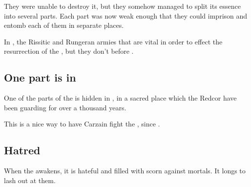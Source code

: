 
They were unable to destroy it, but they somehow managed to split its essence into several parts. Each part was now weak enough that they could imprison and entomb each of them in separate places. 

In \emph{\TwilightAngelRemember{}}, the Rissitic and Rungeran armies  that are vital in order to effect the resurrection of the \Haskelek, but they don't  before \emph{\CarzainWithRedcorBook}. 







\subsection{One part is in \Redce}
One of the parts of the \Haskelek{} is hidden in \Redce, in a sacred place which the Redcor have been guarding for over a thousand years. 

This is a nice way to have Carzain fight the \Haskelek, since .









\subsection{Hatred}
When the \Haskelek{} awakens, it is hateful and filled with scorn against mortals. It longs to lash out at them.

